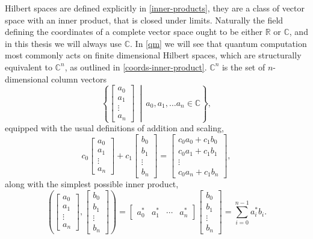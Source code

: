 Hilbert spaces are defined explicitly in \autoref{inner-products}, they are a class of vector space with an inner product, that is closed under limits. Naturally the field defining the coordinates of a complete vector space ought to be either $\mathbb{R}$ or $\mathbb{C}$, and in this thesis we will always use $\mathbb{C}$. In \autoref{qm} we will see that quantum computation most commonly acts on finite dimensional Hilbert spaces, which are structurally equivalent to $\mathbb{C}^n$, as outlined in \autoref{coords-inner-product}. $\mathbb{C}^n$ is the set of $n$-dimensional column vectors
\[\left\{\left[\begin{matrix} a_0\\a_1\\\vdots\\a_n\end{matrix}\right]\ \middle|\ a_0, a_1, \dots a_n \in \mathbb{C}\right\},\]
equipped with the usual definitions of addition and scaling,
\[
c_0\left[\begin{matrix} a_0\\a_1\\\vdots\\a_n\end{matrix}\right]
+
c_1\left[\begin{matrix} b_0\\b_1\\\vdots\\b_n\end{matrix}\right]
=
\left[\begin{matrix} c_0a_0+c_1b_0\\c_0a_1+c_1b_1\\\vdots\\c_0a_n+c_1b_n\end{matrix}\right],
\]
along with the simplest possible inner product,
\[
\left(
\left[\begin{matrix} a_0\\a_1\\\vdots\\a_n\end{matrix}\right]
,
\left[\begin{matrix} b_0\\b_1\\\vdots\\b_n\end{matrix}\right]
\right)
=
\left[\begin{matrix} a_0^*&a_1^*&\cdots&a_n^*\end{matrix}\right]
\left[\begin{matrix} b_0\\b_1\\\vdots\\b_n\end{matrix}\right]
= \sum_{i=0}^{n-1} a_i^*b_i.
\]

